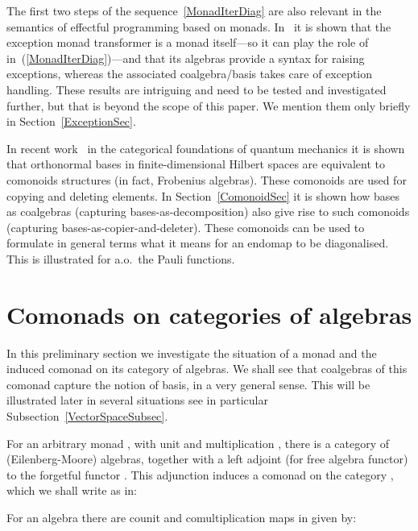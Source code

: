 \documentclass{LMCS}
\newif\ifignore \ignorefalse
\newcommand{\auxproof}[1]{
\ifignore\mbox{}\newline
\textbf{PROOF:} \dotfill\newline
{\it #1}\mbox{}\newline
\textbf{ENDPROOF}\dotfill
\fi}
\begin{document}
The first two steps of the sequence~\eqref{MonadIterDiag} are also
relevant in the semantics of effectful programming based on monads.
In~\cite{Levy06} it is shown that the exception monad transformer is a
monad itself---so it can play the role of 
in~(\ref{MonadIterDiag})---and that its algebras provide a syntax for
raising exceptions, whereas the associated coalgebra/basis takes care
of exception handling. These results are intriguing and need to be
tested and investigated further, but that is beyond the scope of this
paper.  We mention them only briefly in Section~\ref{ExceptionSec}.

In recent work~\cite{CoeckePV12} in the categorical foundations of
quantum mechanics it is shown that orthonormal bases in
finite-dimensional Hilbert spaces are equivalent to comonoids
structures (in fact, Frobenius algebras). These como\-noids are used
for copying and deleting elements. In Section~\ref{ComonoidSec} it is
shown how bases as coalgebras (capturing bases-as-decomposition) also
give rise to such comonoids (capturing
bases-as-copier-and-deleter). These comonoids can be used to formulate
in general terms what it means for an endomap to be diagonalised. This
is illustrated for a.o.\ the Pauli functions.



\section{Comonads on categories of algebras}\label{ComonadSec}

In this preliminary section we investigate the situation of a monad
and the induced comonad on its category of algebras. We shall see that
coalgebras of this comonad capture the notion of basis, in a very
general sense. This will be illustrated later in several situations
see in particular Subsection~\ref{VectorSpaceSubsec}.

For an arbitrary monad , with
unit  and multiplication , there is a category  of
(Eilenberg-Moore) algebras, together with a left adjoint  (for free
algebra functor) to the forgetful functor . This adjunction  induces a comonad on the category , which we shall
write as  in:
\vspace*{-1em}


\noindent For an algebra  there are counit  and comultiplication  maps in  given by:




\auxproof{
In general, for an adjunction  the induced comonad  
comes with counit 
inherited from the adjunction and comultiplication  given by .

In this case, starting from the free algebra adjunction 
the unit is the unit of the monad, and the counit , at an algebra, is this algebra itself, as a map of algebras:

}
\end{document}

